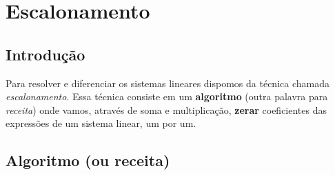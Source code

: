 \chapter{Escalonamento}
\label{chap:esc}

\section{Introdução}
Para resolver e diferenciar os sistemas lineares dispomos da técnica chamada \mbox{\textit{escalonamento}}. Essa técnica consiste em um \textbf{algoritmo} (outra palavra para \textit{receita}) onde vamos, através de soma e multiplicação, \textbf{zerar} coeficientes das expressões de um sistema linear, um por um.

\section{Algoritmo (ou receita)}
